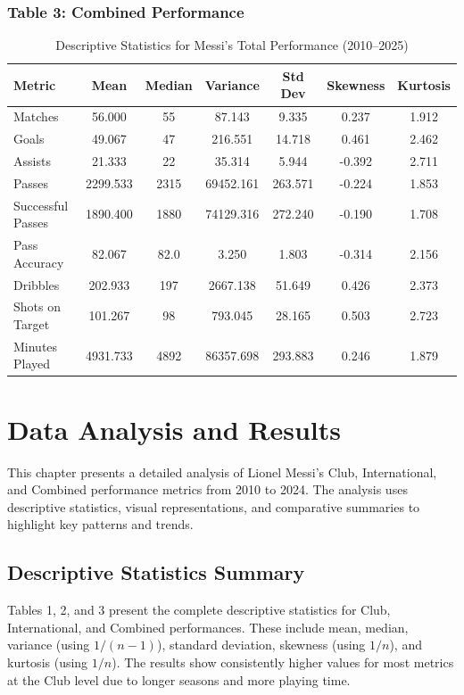 \documentclass[12pt,a4paper]{report}
\begin{document}
\subsection*{Table 3: Combined Performance}
\begin{table}[H]
\centering
\begin{tabular}{lcccccc}
\toprule
\textbf{Metric} & \textbf{Mean} & \textbf{Median} & \textbf{Variance} & \textbf{Std Dev} & \textbf{Skewness} & \textbf{Kurtosis} \\
\midrule
Matches & 56.000 & 55 & 87.143 & 9.335 & 0.237 & 1.912 \\
Goals & 49.067 & 47 & 216.551 & 14.718 & 0.461 & 2.462 \\
Assists & 21.333 & 22 & 35.314 & 5.944 & -0.392 & 2.711 \\
Passes & 2299.533 & 2315 & 69452.161 & 263.571 & -0.224 & 1.853 \\
Successful Passes & 1890.400 & 1880 & 74129.316 & 272.240 & -0.190 & 1.708 \\
Pass Accuracy & 82.067 & 82.0 & 3.250 & 1.803 & -0.314 & 2.156 \\
Dribbles & 202.933 & 197 & 2667.138 & 51.649 & 0.426 & 2.373 \\
Shots on Target & 101.267 & 98 & 793.045 & 28.165 & 0.503 & 2.723 \\
Minutes Played & 4931.733 & 4892 & 86357.698 & 293.883 & 0.246 & 1.879 \\
\bottomrule
\end{tabular}
\caption{Descriptive Statistics for Messi’s Total Performance (2010--2025)}
\end{table}

\chapter{Data Analysis and Results}

This chapter presents a detailed analysis of Lionel Messi’s Club, International, and Combined 
performance metrics from 2010 to 2024. The analysis uses descriptive statistics, visual 
representations, and comparative summaries to highlight key patterns and trends.

\section{Descriptive Statistics Summary}

Tables 1, 2, and 3 present the complete descriptive statistics for Club, International, and Combined 
performances. These include mean, median, variance (using $1/(n-1)$), standard deviation, skewness 
(using $1/n$), and kurtosis (using $1/n$). The results show consistently higher values for most 
metrics at the Club level due to longer seasons and more playing time.
\end{document}
